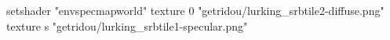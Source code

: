 setshader "envspecmapworld"
texture 0 "getridou/lurking_srbtile2-diffuse.png"
texture s "getridou/lurking_srbtile1-specular.png"

